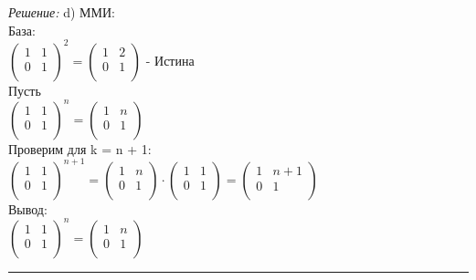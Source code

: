 \documentclass[a4paper, 12pt]{article}
\newenvironment{solution}
    {\textit{Решение: }}
    {\noindent\rule{7in}{1.5pt}}
\begin{document}
\begin{solution}
d)
ММИ: \\
База: \\
$
\left(
  \begin{array}{rr}
    1 & 1 \\
    0 & 1 \\
  \end{array}
\right)^2
=
\left(
  \begin{array}{rr}
    1 & 2 \\
    0 & 1 \\
  \end{array}
\right)
$ - Истина \\
Пусть \\
$
\left(
  \begin{array}{rr}
    1 & 1 \\
    0 & 1 \\
  \end{array}
\right)^n
=
\left(
  \begin{array}{rr}
    1 & n \\
    0 & 1 \\
  \end{array}
\right)
$
\\
Проверим для k = n + 1: \\
$
\left(
  \begin{array}{rr}
    1 & 1 \\
    0 & 1 \\
  \end{array}
\right)^{n + 1}
=
\left(
  \begin{array}{rr}
    1 & n \\
    0 & 1 \\
  \end{array}
\right)
\cdot
\left(
  \begin{array}{rr}
    1 & 1 \\
    0 & 1 \\
  \end{array}
\right)
=
\left(
  \begin{array}{rr}
    1 & n + 1 \\
    0 & 1 \\
  \end{array}
\right)
$
\\
Вывод: \\
$
\left(
  \begin{array}{rr}
    1 & 1 \\
    0 & 1 \\
  \end{array}
\right)^n
=
\left(
  \begin{array}{rr}
    1 & n \\
    0 & 1 \\
  \end{array}
\right)
$ \\

\end{solution}
\end{document}
